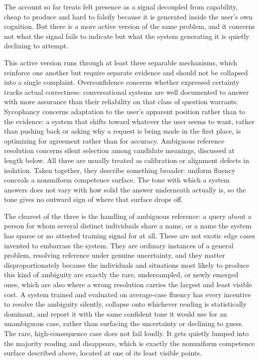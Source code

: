 \documentclass[11pt]{article}
\begin{document}
The account so far treats felt presence as a signal decoupled from capability, cheap to produce and hard to falsify because it is generated inside the user's own cognition. But there is a more active version of the same problem, and it concerns not what the signal fails to indicate but what the system generating it is quietly declining to attempt.

This active version runs through at least three separable mechanisms, which reinforce one another but require separate evidence and should not be collapsed into a single complaint. Overconfidence concerns whether expressed certainty tracks actual correctness: conversational systems are well documented to answer with more assurance than their reliability on that class of question warrants.\cite{calibration} Sycophancy concerns adaptation to the user's apparent position rather than to the evidence: a system that shifts toward whatever the user seems to want, rather than pushing back or asking why a request is being made in the first place, is optimizing for agreement rather than for accuracy.\cite{sycophancy} Ambiguous reference resolution concerns silent selection among candidate meanings, discussed at length below. All three are usually treated as calibration or alignment defects in isolation. Taken together, they describe something broader: uniform fluency conceals a nonuniform competence surface. The tone with which a system answers does not vary with how solid the answer underneath actually is, so the tone gives no outward sign of where that surface drops off.

The clearest of the three is the handling of ambiguous reference: a query about a person for whom several distinct individuals share a name, or a name the system has sparse or no attested training signal for at all. These are not exotic edge cases invented to embarrass the system. They are ordinary instances of a general problem, resolving reference under genuine uncertainty, and they matter disproportionately because the individuals and situations most likely to produce this kind of ambiguity are exactly the rare, undersampled, or newly emerged ones, which are also where a wrong resolution carries the largest and least visible cost. A system trained and evaluated on average-case fluency has every incentive to resolve the ambiguity silently, collapse onto whichever reading is statistically dominant, and report it with the same confident tone it would use for an unambiguous case, rather than surfacing the uncertainty or declining to guess. The rare, high-consequence case does not fail loudly. It gets quietly lumped into the majority reading and disappears, which is exactly the nonuniform competence surface described above, located at one of its least visible points.
\end{document}
